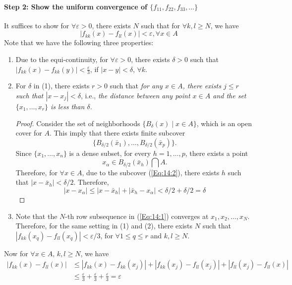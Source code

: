 \paragraph{Step 2: Show the uniform convergence of $\{f_{11},f_{22},f_{33},\dots\}$}
It suffices to show for $\forall\varepsilon>0$, there exists $N$ such that for $\forall k,l\ge N$, we have
\[
|f_{kk}(x)-f_{ll}(x)|<\varepsilon,\forall x\in A
\]
Note that we have the following three properties:
\begin{enumerate}
\item
Due to the equi-continuity, for $\forall\varepsilon>0$, there exists $\delta>0$ such that $|f_{kk}(x)-f_{kk}(y)|<\frac{\varepsilon}{3}$, if $|x-y|<\delta$, $\forall k$.
\item
For $\delta$ in (1), there exists $r>0$ such that \textit{for any $x\in A$, there exists $j\le r$ such that $|x-x_j|<\delta$}, i.e., \textit{the distance between any point $x\in A$ and the set $\{x_1,\dots,x_r\}$ is less than $\delta$.}
\begin{proof}
Consider the set of neighborhoods $\{B_\delta(x)\mid x\in A\}$, which is an open cover for $A$. This imply that there exists finite subcover 
\begin{equation}
\{B_{\delta/2}(\bar x_1),\dots,B_{\delta/2}(\bar x_p)\}.\label{Eq:14:2}
\end{equation}
Since $\{x_1,\dots,x_n\}$ is a dense subset, for every $h=1,\dots,p$, there exists a point 
\begin{equation}\label{Eq:14:3}
x_\alpha\in B_{\delta/2}(\bar x_h)\bigcap A.
\end{equation}
Therefore, for $\forall x\in A$, due to the subcover (\ref{Eq:14:2}), there exists $h$ such that $|x-\bar x_h|<\delta/2$. Therefore,
\[
|x-x_\alpha|\le|x-\bar x_h|+|\bar x_h-x_\alpha|<\delta/2+\delta/2=\delta
\]

\end{proof}
\item
Note that the $N$-th row subsequence in (\ref{Eq:14:1}) converges at $x_1,x_2,\dots,x_N$. Therefore, for the same setting in (1) and (2), there exists $N$ such that $|f_{kk}(x_q)-f_{ll}(x_q)|<\varepsilon/3$, for $\forall 1\le q\le r$ and $k,l\ge N$.

\end{enumerate}
Now for $\forall x\in A$, $k,l\ge N$, we have
\begin{subequations}
\begin{align}
|f_{kk}(x)-f_{ll}(x)|&\le |f_{kk}(x)-f_{kk}(x_j)|
+
|f_{kk}(x_j)-f_{ll}(x_j)|+|f_{ll}(x_j)-f_{ll}(x)|\label{Eq:14:4:a}
\\&\le
\frac{\varepsilon}{3}+\frac{\varepsilon}{3}+\frac{\varepsilon}{3}=\varepsilon
\end{align}
\end{subequations}

